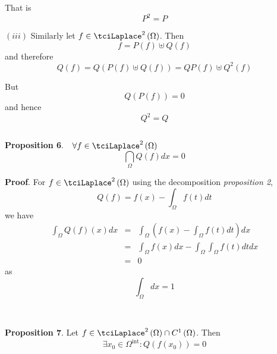 \documentclass{amsproc}
\theoremstyle{plain}
\numberwithin{equation}{section}
\begin{document}
That is\begin{equation*}
P^{2}=P
\end{equation*}

$\left( iii\right) $ Similarly let $f\in \tciLaplace ^{2}\left( \Omega
\right) $. Then\begin{equation*}
f=P\left( f\right) \uplus Q\left( f\right)
\end{equation*}and therefore 
\begin{equation*}
Q\left( f\right) =Q\left( P\left( f\right) \uplus Q\left( f\right) \right)
=QP\left( f\right) \uplus Q^{2}\left( f\right)
\end{equation*}

But 
\begin{equation*}
Q\left( P\left( f\right) \right) =0
\end{equation*}and hence 
\begin{equation*}
Q^{2}=Q
\end{equation*}

$\ \ \ \ \ \ \ \ \ \ \ \ \ \ \ \ \ \ \ \ \ \ \ \ \ \ \ \ \ \ \ \ $

\textbf{Proposition 6}. $\ \ \forall f\in \tciLaplace ^{2}\left( \Omega
\right) $\begin{equation*}
\dint\limits_{\Omega }Q\left( f\right) dx=0
\end{equation*}

\textbf{Proof}. For $f\in \tciLaplace ^{2}\left( \Omega \right) $ using the
decomposition \textit{proposition 2},\begin{equation*}
Q\left( f\right) =f(x)-\int_{\Omega }f(t)dt
\end{equation*}we have 
\begin{eqnarray*}
\int_{\Omega }Q(f)(x)dx &=&\int_{\Omega }\left( f(x)-\int_{\Omega
}f(t)dt\right) dx \\
&=&\int_{\Omega }f(x)dx-\int_{\Omega }\int_{\Omega }f(t)dtdx \\
&=&0
\end{eqnarray*}as 
\begin{equation*}
\int_{\Omega }dx=1
\end{equation*}

\ \ \ 

\textbf{Proposition 7}. Let $f\in \tciLaplace ^{2}\left( \Omega \right) \cap
C^{1}\left( \Omega \right) $. Then 
\begin{equation*}
\exists x_{0}\in \Omega ^{\text{int}}:Q\left( f\left( x_{0}\right) \right) =0
\end{equation*}
\end{document}
